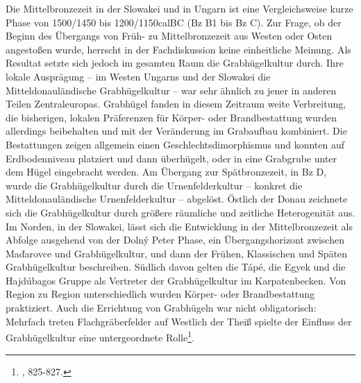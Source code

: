 \documentclass[openany,twoside,twocolumn]{book}
\let\rmarkdownfootnote\footnote%
\def\footnote{\protect\rmarkdownfootnote}
\begin{document}
Die Mittelbronzezeit in der Slowakei und in Ungarn ist eine
Vergleichsweise kurze Phase von 1500/1450 bis 1200/1150calBC (Bz B1 bis
Bz C). Zur Frage, ob der Beginn des Übergangs von Früh- zu
Mittelbronzezeit aus Westen oder Osten angestoßen wurde, herrscht in der
Fachdiskussion keine einheitliche Meinung. Als Resultat setzte sich
jedoch im gesamten Raum die Grabhügelkultur durch. Ihre lokale
Ausprägung -- im Westen Ungarns und der Slowakei die
Mitteldonauländische Grabhügelkultur -- war sehr ähnlich zu jener in
anderen Teilen Zentraleuropas. Grabhügel fanden in diesem Zeitraum weite
Verbreitung, die bisherigen, lokalen Präferenzen für Körper- oder
Brandbestattung wurden allerdings beibehalten und mit der Veränderung im
Grabaufbau kombiniert. Die Bestattungen zeigen allgemein einen
Geschlechtsdimorphismus und konnten auf Erdbodenniveau platziert und
dann überhügelt, oder in eine Grabgrube unter dem Hügel eingebracht
werden. Am Übergang zur Spätbronzezeit, in Bz D, wurde die
Grabhügelkultur durch die Urnenfelderkultur -- konkret die
Mitteldonauländische Urnenfelderkultur -- abgelöst. Östlich der Donau
zeichnete sich die Grabhügelkultur durch größere räumliche und zeitliche
Heterogenität aus. Im Norden, in der Slowakei, lässt sich die
Entwicklung in der Mittelbronzezeit als Abfolge ausgehend von der Dolný
Peter Phase, ein Übergangshorizont zwischen Maďarovce und
Grabhügelkultur, und dann der Frühen, Klassischen und Späten
Grabhügelkultur beschreiben. Südlich davon gelten die Tápé, die Egyek
und die Hajdúbagos Gruppe als Vertreter der Grabhügelkultur im
Karpatenbecken. Von Region zu Region unterschiedlich wurden Körper- oder
Brandbestattung praktiziert. Auch die Errichtung von Grabhügeln war
nicht obligatorisch: Mehrfach treten Flachgräberfelder auf Westlich der
Theiß spielte der Einfluss der Grabhügelkultur eine untergeordnete
Rolle\footnote{\textcite{markova_slovakia_2013}, 825-827.}.
\end{document}

